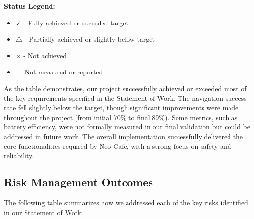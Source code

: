 \documentclass[12pt]{article}
\begin{document}
\textbf{Status Legend:}
\begin{itemize}
    \item $\checkmark$ - Fully achieved or exceeded target
    \item $\triangle$ - Partially achieved or slightly below target
    \item $\times$ - Not achieved
    \item - - Not measured or reported
\end{itemize}

As the table demonstrates, our project successfully achieved or exceeded most of the key requirements specified in the Statement of Work. The navigation success rate fell slightly below the target, though significant improvements were made throughout the project (from initial 70\% to final 89\%). Some metrics, such as battery efficiency, were not formally measured in our final validation but could be addressed in future work. The overall implementation successfully delivered the core functionalities required by Neo Cafe, with a strong focus on safety and reliability.

\subsection{Risk Management Outcomes}

The following table summarizes how we addressed each of the key risks identified in our Statement of Work:
\end{document}
